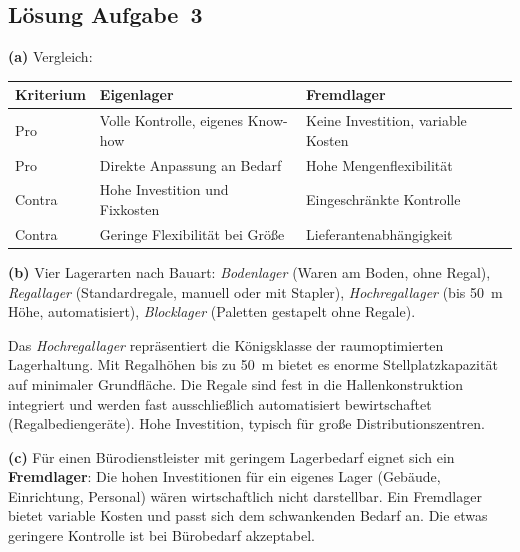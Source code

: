 \documentclass[11pt, a4paper]{article}
\begin{document}
\subsection*{Lösung Aufgabe~3}
\begin{loesung}
\textbf{(a)} Vergleich:

\begin{center}
\begin{tabular}{p{4.5cm} p{4.5cm} p{4.5cm}}
\toprule
\textbf{Kriterium} & \textbf{Eigenlager} & \textbf{Fremdlager}\\
\midrule
Pro & Volle Kontrolle, eigenes Know-how & Keine Investition, variable Kosten\\
Pro & Direkte Anpassung an Bedarf & Hohe Mengenflexibilität\\
Contra & Hohe Investition und Fixkosten & Eingeschränkte Kontrolle\\
Contra & Geringe Flexibilität bei Größe & Lieferantenabhängigkeit\\
\bottomrule
\end{tabular}
\end{center}

\textbf{(b)} Vier Lagerarten nach Bauart: \emph{Bodenlager} (Waren am Boden, ohne Regal),
\emph{Regallager} (Standardregale, manuell oder mit Stapler), \emph{Hochregallager}
(bis 50~m Höhe, automatisiert), \emph{Blocklager} (Paletten gestapelt ohne Regale).

Das \emph{Hochregallager} repräsentiert die Königsklasse der raumoptimierten Lagerhaltung.
Mit Regalhöhen bis zu 50~m bietet es enorme Stellplatzkapazität auf minimaler
Grundfläche. Die Regale sind fest in die Hallenkonstruktion integriert und werden
fast ausschließlich automatisiert bewirtschaftet (Regalbediengeräte). Hohe Investition,
typisch für große Distributionszentren.

\textbf{(c)} Für einen Bürodienstleister mit geringem Lagerbedarf eignet sich ein
\textbf{Fremdlager}: Die hohen Investitionen für ein eigenes Lager (Gebäude, Einrichtung,
Personal) wären wirtschaftlich nicht darstellbar. Ein Fremdlager bietet variable Kosten
und passt sich dem schwankenden Bedarf an. Die etwas geringere Kontrolle ist bei
Bürobedarf akzeptabel.
\end{loesung}
\end{document}
